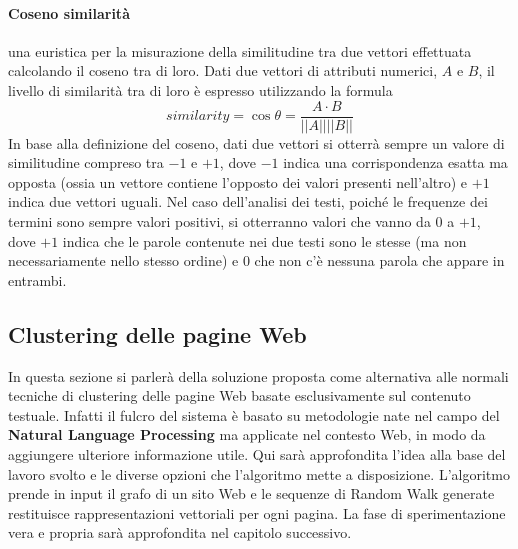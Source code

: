 \paragraph{Coseno similarità} una euristica per la misurazione della similitudine tra due vettori effettuata calcolando il coseno tra di loro. Dati due vettori di attributi numerici, $A$ e $B$, il livello di similarità tra di loro è espresso utilizzando la formula
\begin{equation}
	similarity = \cos \theta = \frac{A\cdot B}{||A||||B||}
\end{equation}
In base alla definizione del coseno, dati due vettori si otterrà sempre un valore di similitudine compreso tra $-1$ e $+1$, dove $-1$ indica una corrispondenza esatta ma opposta (ossia un vettore contiene l'opposto dei valori presenti nell'altro) e $+1$ indica due vettori uguali.
Nel caso dell'analisi dei testi, poiché le frequenze dei termini sono sempre valori positivi, si otterranno valori che vanno da 0 a $+1$, dove $+1$ indica che le parole contenute nei due testi sono le stesse (ma non necessariamente nello stesso ordine) e $0$ che non c'è nessuna parola che appare in entrambi.

\subsection{Clustering delle pagine Web}
In questa sezione si parlerà della soluzione proposta come alternativa alle normali tecniche di clustering delle pagine Web basate esclusivamente sul contenuto testuale. Infatti il fulcro del sistema è basato su metodologie nate nel campo del \textbf{Natural Language Processing} ma applicate nel contesto Web, in modo da aggiungere ulteriore informazione utile. Qui sarà approfondita l'idea alla base del lavoro svolto e le diverse opzioni che l'algoritmo mette a disposizione. 
L'algoritmo prende in input il grafo di un sito Web e le sequenze di Random Walk generate restituisce rappresentazioni vettoriali per ogni pagina.
La fase di sperimentazione vera e propria sarà approfondita nel capitolo successivo.

